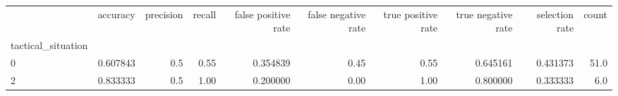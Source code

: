 \begin{tabular}{lrrrrrrrrr}
\toprule
{} &  accuracy &  precision &  recall &  false positive rate &  false negative rate &  true positive rate &  true negative rate &  selection rate &  count \\
tactical\_situation &           &            &         &                      &                      &                     &                     &                 &        \\
\midrule
0                  &  0.607843 &        0.5 &    0.55 &             0.354839 &                 0.45 &                0.55 &            0.645161 &        0.431373 &   51.0 \\
2                  &  0.833333 &        0.5 &    1.00 &             0.200000 &                 0.00 &                1.00 &            0.800000 &        0.333333 &    6.0 \\
\bottomrule
\end{tabular}
